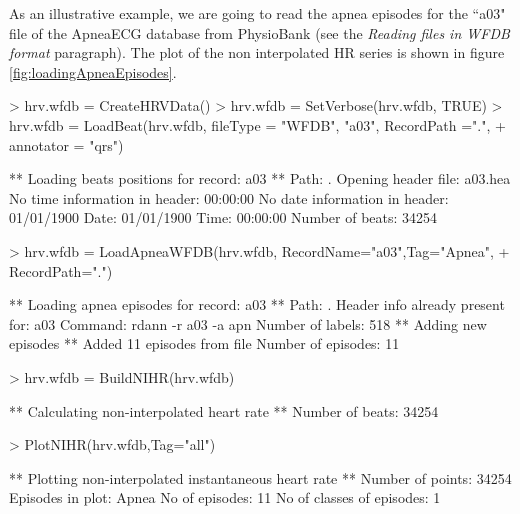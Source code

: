 \documentclass[12pt,lot, lof]{puthesis}
\begin{document}
As an illustrative example, we are going to read the apnea episodes for the 
``a03" file of the ApneaECG database from PhysioBank (see the \textit{Reading 
files in WFDB format} paragraph). The plot of the non interpolated \gls{HR} 
series is shown in figure \ref{fig:loadingApneaEpisodes}.
\begin{Schunk}
\begin{Sinput}
> hrv.wfdb = CreateHRVData()
> hrv.wfdb = SetVerbose(hrv.wfdb, TRUE)
> hrv.wfdb = LoadBeat(hrv.wfdb, fileType = "WFDB", "a03", RecordPath =".", 
+                     annotator = "qrs")
\end{Sinput}
\begin{Soutput}
** Loading beats positions for record: a03 **
   Path: . 
   Opening header file: a03.hea 
      No time information in header: 00:00:00 
      No date information in header: 01/01/1900 
   Date: 01/01/1900
   Time: 00:00:00
   Number of beats: 34254 
\end{Soutput}
\begin{Sinput}
> hrv.wfdb = LoadApneaWFDB(hrv.wfdb, RecordName="a03",Tag="Apnea",
+ RecordPath=".")
\end{Sinput}
\begin{Soutput}
** Loading apnea episodes for record: a03 **
   Path: . 
   Header info already present for: a03 
   Command: rdann -r a03 -a apn 
   Number of labels: 518 
** Adding new episodes **
   Added 11 episodes from file
   Number of episodes: 11 
\end{Soutput}
\begin{Sinput}
> hrv.wfdb = BuildNIHR(hrv.wfdb)
\end{Sinput}
\begin{Soutput}
** Calculating non-interpolated heart rate **
   Number of beats: 34254 
\end{Soutput}
\begin{Sinput}
> PlotNIHR(hrv.wfdb,Tag="all")
\end{Sinput}
\begin{Soutput}
** Plotting non-interpolated instantaneous heart rate **
   Number of points: 34254 
   Episodes in plot: Apnea 
   No of episodes: 11 
   No of classes of episodes: 1 
\end{Soutput}
\end{Schunk}
\end{document}

